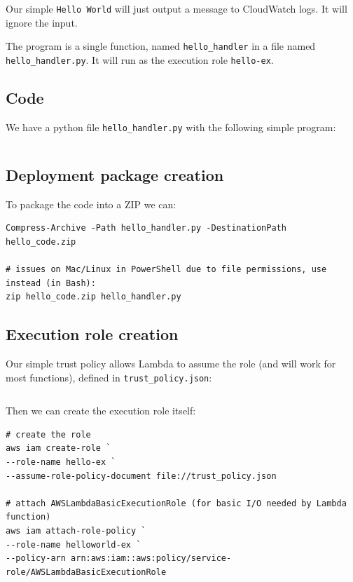 \documentclass[slides]{pgnotes}
\begin{document}
Our simple \texttt{Hello\ World} will just output a message to
CloudWatch logs. It will ignore the input.

The program is a single function, named \texttt{hello\_handler} in a
file named \texttt{hello\_handler.py}. It will run as the execution role
\texttt{hello-ex}.

\subsection{Code}\label{code-1}

We have a python file \texttt{hello\_handler.py} with the following
simple program:

\inputminted{python}{hello_handler.py}

\subsection{Deployment package
creation}\label{deployment-package-creation-1}

To package the code into a ZIP we can:

\begin{verbatim}
Compress-Archive -Path hello_handler.py -DestinationPath hello_code.zip

# issues on Mac/Linux in PowerShell due to file permissions, use instead (in Bash):
zip hello_code.zip hello_handler.py
\end{verbatim}

\subsection{Execution role creation}\label{execution-role-creation}

Our simple trust policy allows Lambda to assume the role (and will work for most functions), defined in \texttt{trust\_policy.json}:

\inputminted{json}{trust_policy.json}

Then we can create the execution role itself:

\begin{verbatim}
# create the role 
aws iam create-role `
--role-name hello-ex `
--assume-role-policy-document file://trust_policy.json

# attach AWSLambdaBasicExecutionRole (for basic I/O needed by Lambda function)
aws iam attach-role-policy `
--role-name helloworld-ex `
--policy-arn arn:aws:iam::aws:policy/service-role/AWSLambdaBasicExecutionRole
\end{verbatim}
\end{document}
